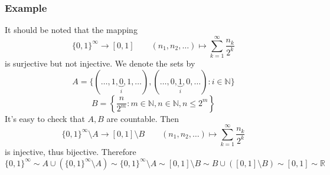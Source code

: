 \subsubsection{Example}

It should be noted that the mapping
\[
\{ 0,1 \}^{\infty}\to[0,1]\qquad (n_1,n_2,\dots)\mapsto \sum_{k=1}^{\infty}\frac{n_k}{2^{k}} 
\]
is surjective but not injective. We denote the sets by
\[
A=\{ (\dots,1,\underbrace{ 0 }_{ i },1,\dots),(\dots,0,\underbrace{ 1 }_{ i },0,\dots):i\in \mathbb{N} \}
\]
\[
B=\left\{  \frac{n}{2^{m}} :m\in \mathbb{N},n\in \mathbb{N},n\leq 2^{m}  \right\}
\]
It's easy to check that $A,B$ are countable. Then
\[
\{ 0,1 \}^{\infty}\setminus A\to[0,1]\setminus B\qquad (n_1,n_2,\dots)\mapsto \sum_{k=1}^{\infty}\frac{n_k}{2^{k}} 
\]
is injective, thus bijective. Therefore
\[
\{ 0,1 \}^{\infty}\sim A\cup(\{ 0,1 \}^{\infty}\setminus A)\sim \{ 0,1 \}^{\infty}\setminus A\sim [0,1]\setminus B\sim B\cup([0,1]\setminus B)\sim [0,1]\sim \mathbb{R}
\]
